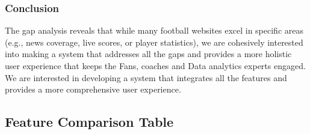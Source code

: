 \subsubsection{Conclusion}
The gap analysis reveals that while many football websites excel in specific areas (e.g., news coverage, live scores, or player statistics), we are cohesively interested into making a system that addresses all the gaps and provides a more holistic user experience that keeps the Fans, coaches and Data analytics experts engaged. We are interested in developing a system that integrates all the features and provides a more comprehensive user experience.

\subsection{Feature Comparison Table}

